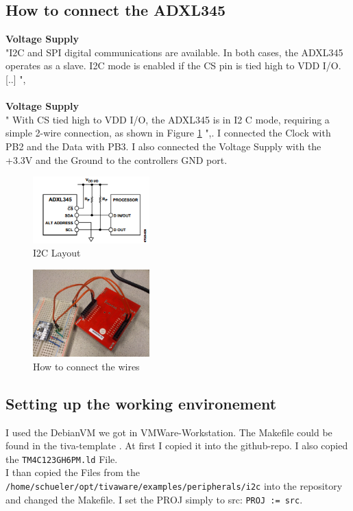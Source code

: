 \documentclass[12pt]{article}
\begin{document}
\subsection{How to connect the ADXL345}
\textbf{Voltage Supply} \\
"I2C and SPI digital communications are available. In both cases,
the ADXL345 operates as a slave. I2C mode is enabled if the CS
pin is tied high to VDD I/O. [..] ",\cite[page 15]{datasheetADXL}
\\ \\
\textbf{Voltage Supply} \\
" With CS tied high to VDD I/O, the ADXL345 is in I2
C mode, requiring a simple 2-wire connection, as shown in Figure \ref{fig:i2clayout} ",\cite[page 18]{datasheetADXL}. I connected the Clock with PB2 and the Data with PB3. I also connected the Voltage Supply with the +3.3V and the Ground to the controllers GND port.
\begin{figure}[here!]
\centering
    \includegraphics[width=0.4\textwidth]{images/i2clayout}
    \caption{I2C Layout \cite[page 18]{datasheetADXL}}
    \label{fig:i2clayout}
\end{figure}
\begin{figure}[here!]
\centering
    \includegraphics[width=0.4\textwidth]{images/con2}
    \caption{How to connect the wires}
    \label{fig:i2clayout2}
\end{figure}
\subsection{Setting up the working environement}
I used the DebianVM we got in VMWare-Workstation. The Makefile could be found in the tiva-template \cite{tivatemp}. At first I copied it into the github-repo. I also copied the \texttt{TM4C123GH6PM.ld} File.
\\ I than copied the Files from the \texttt{/home/schueler/opt/tivaware/examples/peripherals/i2c} into the repository and changed the Makefile. I set the PROJ simply to src: \texttt{PROJ := src}. 
\newpage
\end{document}
